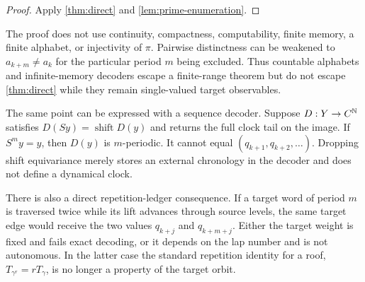 \begin{proof}
Apply \cref{thm:direct} and \cref{lem:prime-enumeration}.
\end{proof}

\begin{remark}
\label{rem:assumption-boundary}
The proof does not use continuity, compactness, computability, finite
memory, a finite alphabet, or injectivity of $\pi$.  Pairwise distinctness
can be weakened to $a_{k+m}\ne a_k$ for the particular period $m$ being
excluded.  Thus countable alphabets and infinite-memory decoders escape a
finite-range theorem but do not escape \cref{thm:direct} while they remain
single-valued target observables.
\end{remark}

The same point can be expressed with a sequence decoder.  Suppose
$D:Y\to C^{\mathbb{N}}$ satisfies
$D(Sy)=\operatorname{shift}D(y)$ and returns the full clock tail on the
image.  If $S^my=y$, then $D(y)$ is $m$-periodic.  It cannot equal
$(q_{k+1},q_{k+2},\ldots)$.  Dropping shift equivariance merely stores an
external chronology in the decoder and does not define a dynamical clock.

There is also a direct repetition-ledger consequence.  If a target word of
period $m$ is traversed twice while its lift advances through source levels,
the same target edge would receive the two values $q_{k+j}$ and
$q_{k+m+j}$.  Either the target weight is fixed and fails exact decoding, or
it depends on the lap number and is not autonomous.  In the latter case the
standard repetition identity for a roof,
$T_{\gamma^r}=rT_\gamma$, is no longer a property of the target orbit.
